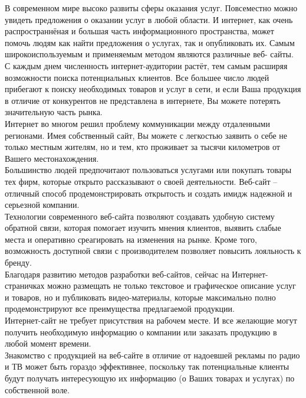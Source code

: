 	\hspace{4ex}В современном мире высоко развиты сферы оказания услуг. Повсеместно можно увидеть предложения о оказании услуг в любой области.
	И интернет, как очень распространнёная и большая часть информационного пространства, может помочь людям как найти предложения о услугах, так и опубликовать их. Самым широкоиспользуемым и применяемым методом являются различные веб-		сайты.\\
	\hspace{4ex} С каждым днем численность интернет-аудитории растёт, тем самым расширяя возможности поиска потенциальных клиентов. Все большее число людей прибегают к поиску необходимых товаров и услуг в сети, и если Ваша продукция в 		отличие от конкурентов не представлена в интернете, Вы можете потерять значительную часть рынка.\\
	\hspace{4ex}Интернет во многом решил проблему коммуникации между отдаленными регионами. Имея собственный сайт, Вы можете с легкостью заявить о себе не только местным жителям, но и тем, кто проживает за тысячи километров от Вашего 		местонахождения.\\
	\hspace{4ex} Большинство людей предпочитают пользоваться услугами или покупать товары тех фирм, которые открыто рассказывают о своей деятельности. Веб-сайт – отличный способ продемонстрировать открытость и создать имидж надежной и 		серьезной компании.\\
	\hspace{4ex}Технологии современного веб-сайта позволяют создавать удобную систему обратной связи, которая помогает изучить мнения клиентов, выявить слабые места и оперативно среагировать на изменения на рынке. Кроме того, возможность 		доступной связи с производителем позволяет повысить лояльность к бренду.\\
	\hspace{4ex}Благодаря развитию методов разработки веб-сайтов, сейчас на Интернет-страничках можно размещать не только текстовое и графическое описание услуг и товаров, но и публиковать видео-материалы, которые максимально полно 			продемонстрируют все преимущества предлагаемой продукции.\\
	\hspace{4ex}Интернет-сайт не требует присутствия на рабочем месте. И все желающие могут получить необходимую информацию о компании или заказать продукцию в любой момент времени.\\
	\hspace{4ex}Знакомство с продукцией на веб-сайте в отличие от надоевшей рекламы по радио и ТВ может быть гораздо эффективнее, поскольку так потенциальные клиенты будут получать интересующую их информацию (о Ваших товарах и услугах) 		по собственной воле.\\
